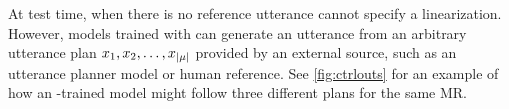 At test time, when there is no reference utterance 
cannot specify a linearization. However, models trained with 
can generate an  utterance from an arbitrary utterance plan
$x_1, x_2, \ldots, x_{{\lvert \mu \rvert}}$ 
provided by an external source, such as an utterance planner model or human 
reference. See \autoref{fig:ctrlouts} for an example of how an -trained model might follow three different plans for the same MR.


